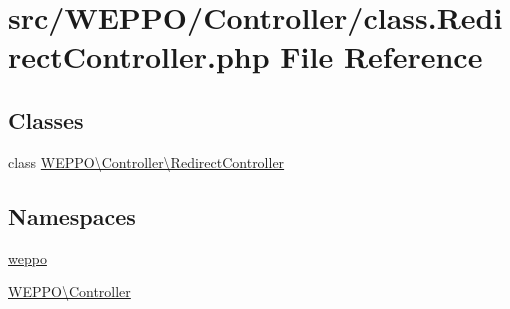 \hypertarget{class_8RedirectController_8php}{}\section{src/\+W\+E\+P\+P\+O/\+Controller/class.Redirect\+Controller.\+php File Reference}
\label{class_8RedirectController_8php}
\subsection*{Classes}
\begin{DoxyCompactItemize}
\item 
class \hyperlink{classWEPPO_1_1Controller_1_1RedirectController}{W\+E\+P\+P\+O\textbackslash{}\+Controller\textbackslash{}\+Redirect\+Controller}
\end{DoxyCompactItemize}
\subsection*{Namespaces}
\begin{DoxyCompactItemize}
\item 
 \hyperlink{namespaceweppo}{weppo}
\item 
 \hyperlink{namespaceWEPPO_1_1Controller}{W\+E\+P\+P\+O\textbackslash{}\+Controller}
\end{DoxyCompactItemize}
